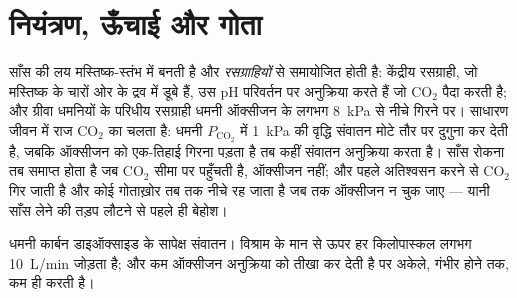 \section{नियंत्रण, ऊँचाई और गोता}

\begin{proposition}[संवातन कार्बन डाइऑक्साइड से नियंत्रित होता है]\label{prop:b1:gas-exchange:control}
साँस की लय मस्तिष्क-स्तंभ में बनती है और \emph{रसग्राहियों} से
समायोजित होती है: केंद्रीय रसग्राही, जो मस्तिष्क के चारों ओर के द्रव में
डूबे हैं, उस pH परिवर्तन पर अनुक्रिया करते हैं जो $\mathrm{CO_2}$ पैदा
करती है; और ग्रीवा धमनियों के परिधीय रसग्राही धमनी ऑक्सीजन के लगभग
\qty{8}{kPa} से नीचे गिरने पर। साधारण जीवन में राज
$\mathrm{CO_2}$ का चलता है: धमनी $P_{\mathrm{CO_2}}$ में \qty{1}{kPa}
की वृद्धि संवातन मोटे तौर पर दुगुना कर देती है, जबकि ऑक्सीजन को
एक-तिहाई गिरना पड़ता है तब कहीं संवातन अनुक्रिया करता है। साँस रोकना तब
समाप्त होता है जब $\mathrm{CO_2}$ सीमा पर पहुँचती है, ऑक्सीजन नहीं; और
पहले अतिश्वसन करने से $\mathrm{CO_2}$ गिर जाती है और कोई गोताख़ोर तब तक
नीचे रह जाता है जब तक ऑक्सीजन न चुक जाए --- यानी साँस लेने की तड़प
लौटने से पहले ही बेहोश।
\end{proposition}

\begin{omfigure}

{\small धमनी कार्बन डाइऑक्साइड के सापेक्ष संवातन। विश्राम के मान से ऊपर
हर किलोपास्कल लगभग \qty{10}{L/min} जोड़ता है; और कम ऑक्सीजन
अनुक्रिया को तीखा कर देती है पर अकेले, गंभीर होने तक, कम ही करती है।}
\end{omfigure}

